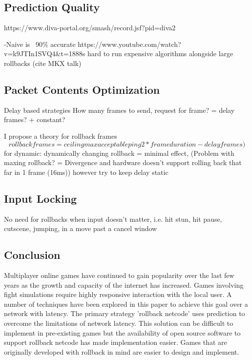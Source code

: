 \documentclass{entcs}
\begin{document}
\subsection{Prediction Quality}
https://www.diva-portal.org/smash/record.jsf?pid=diva2%

-Naive is ~90\% accurate {https://www.youtube.com/watch?v=k9JTIn1SVQ4\&t=1888s}
hard to run expensive algorithms alongside large rollbacks (cite MKX talk)

\subsection{Packet Contents Optimization}
Delay based strategies
How many frames to send, request for frame? = delay frames? + constant?

I propose a theory for rollback frames 
\[rollback frames = ceiling{max acceptable ping}{2*frameduration} - delay frames)\]
for dynamic: dynamically changing rollback = minimal effect, (Problem with maxing rollback? = Divergence and hardware doesn't support rolling back that far in 1 frame (16ms))
however try to keep delay static \cite{sec:Industry Issues}

\subsection{Input Locking}
No need for rollbacks when input doesn't matter, i.e. hit stun, hit pause, cutscene, jumping, in a move past a cancel window \cite{sec:Industry Issues}

\subsection{Conclusion}

Multiplayer online games have continued to gain popularity over the last few years as the growth and capacity of the internet has increased. Games involving fight simulations require highly responsive interaction with the local user. A number of techniques have been explored in this paper to achieve this goal over a network with latency. The primary strategy 'rollback netcode' uses prediction to overcome the limitations of network latency. This solution can be difficult to implement in pre-existing games but the availability of open source software to support rollback netcode has made implementation easier. Games that are originally developed with rollback in mind are easier to design and implement.
\end{document}
